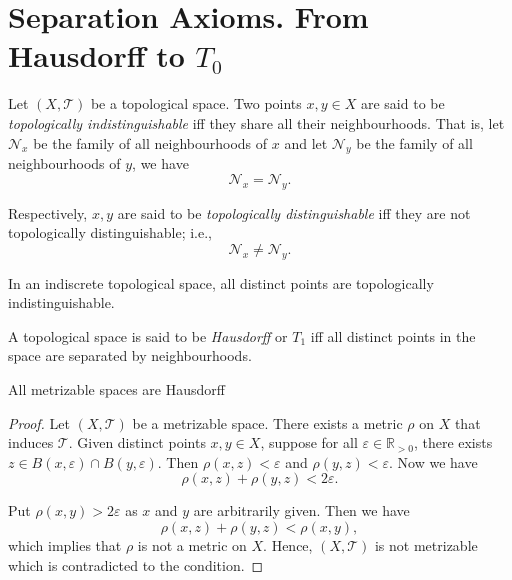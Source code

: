 \section{Separation Axioms. From Hausdorff to $T_0$}





\begin{definition}
	\label{def: topologically indistinguishable}
	Let $(X, \mathcal T)$ be a topological space. Two points $x,y \in X$ are said to be \textit{topologically indistinguishable} iff they share all their neighbourhoods. That is, let $\mathcal N_x$ be the family of all neighbourhoods of $x$ and let $\mathcal N_y$ be the family of all neighbourhoods of $y$, we have
	$$
	\mathcal N_x = \mathcal N_y.
	$$
	
	Respectively, $x,y$ are said to be \textit{topologically distinguishable} iff they are not topologically distinguishable; i.e.,
	$$
	\mathcal N_x \ne \mathcal N_y.
	$$
\end{definition}


\begin{example}
	In an indiscrete topological space, all distinct points are topologically indistinguishable.
\end{example}


\begin{definition}
	\label{def: Hausdorff spaces}
	A topological space is said to be \textit{Hausdorff} or $T_1$ iff all distinct points in the space are separated by neighbourhoods.
\end{definition}


\begin{proposition}
	All metrizable spaces are Hausdorff
	
	\begin{proof}
		Let $(X, \mathcal T)$ be a metrizable space. There exists a metric $\rho$ on $X$ that induces $\mathcal T$. Given distinct points $x,y \in X$, suppose for all $\varepsilon \in \mathbb R_{> 0}$, there exists $z \in B(x, \varepsilon) \cap B(y, \varepsilon)$. Then $\rho(x, z) < \varepsilon$ and $\rho(y, z) < \varepsilon$. Now we have
		$$
		\rho(x, z) + \rho(y, z) < 2\varepsilon.
		$$
		
		Put $\rho(x,y) > 2\varepsilon$ as $x$ and $y$ are arbitrarily given. Then we have
		$$
		\rho(x, z) + \rho(y,z) < \rho(x,y),
		$$
		which implies that $\rho$ is not a metric on $X$. Hence, $(X, \mathcal T)$ is not metrizable which is contradicted to the condition.
	\end{proof}
\end{proposition}


